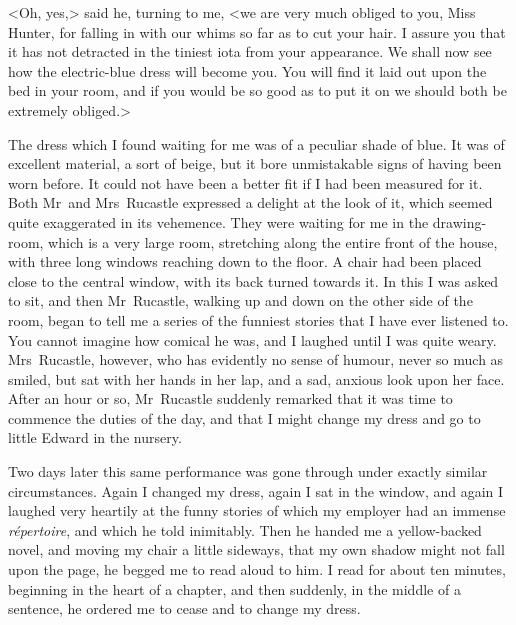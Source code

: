<Oh, yes,> said he, turning to me, <we are very much obliged to you, Miss Hunter, for falling in with our whims so far as to cut your hair. I assure you that it has not detracted in the tiniest iota from your appearance. We shall now see how the electric-blue dress will become you. You will find it laid out upon the bed in your room, and if you would be so good as to put it on we should both be extremely obliged.>

The dress which I found waiting for me was of a peculiar shade of blue. It was of excellent material, a sort of beige, but it bore unmistakable signs of having been worn before. It could not have been a better fit if I had been measured for it. Both Mr~and Mrs~Rucastle expressed a delight at the look of it, which seemed quite exaggerated in its vehemence. They were waiting for me in the drawing-room, which is a very large room, stretching along the entire front of the house, with three long windows reaching down to the floor. A chair had been placed close to the central window, with its back turned towards it. In this I was asked to sit, and then Mr~Rucastle, walking up and down on the other side of the room, began to tell me a series of the funniest stories that I have ever listened to. You cannot imagine how comical he was, and I laughed until I was quite weary. Mrs~Rucastle, however, who has evidently no sense of humour, never so much as smiled, but sat with her hands in her lap, and a sad, anxious look upon her face. After an hour or so, Mr~Rucastle suddenly remarked that it was time to commence the duties of the day, and that I might change my dress and go to little Edward in the nursery.

Two days later this same performance was gone through under exactly similar circumstances. Again I changed my dress, again I sat in the window, and again I laughed very heartily at the funny stories of which my employer had an immense \textit{répertoire}, and which he told inimitably. Then he handed me a yellow-backed novel, and moving my chair a little sideways, that my own shadow might not fall upon the page, he begged me to read aloud to him. I read for about ten minutes, beginning in the heart of a chapter, and then suddenly, in the middle of a sentence, he ordered me to cease and to change my dress.

